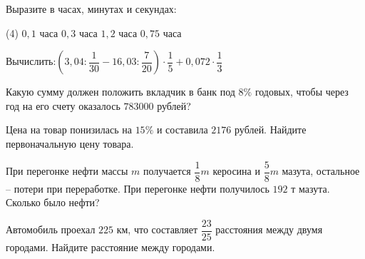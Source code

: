 %
%
\begin{exam}
	\begin{listofex}
		\item Выразите в часах, минутах и секундах:
		\begin{tasks}(4)
			\task \(0,1\) часа
			\task \(0,3\) часа
			\task \(1,2\) часа
			\task \(0,75\) часа
		\end{tasks}
		\item Вычислить:\quad\(\left(3,04:\dfrac{1}{30}-16,03: \dfrac{7}{20}\right) \cdot \dfrac{1}{5} + 0,072 \cdot \dfrac{1}{3}\)
		\item Какую сумму должен положить вкладчик в банк под \( 8\% \) годовых, чтобы через год на его счету оказалось \( 783 000 \) рублей?
		\item Цена на товар понизилась на \(15\%\) и составила \(2176\) рублей. Найдите первоначальную цену товара.
		\item При перегонке нефти массы \( m \) получается \(\dfrac{1}{8}m\)  керосина и \(\dfrac{5}{8}m \)  мазута, остальное – потери при переработке. При перегонке нефти получилось \(192\) т мазута. Сколько было нефти?
		\item Автомобиль проехал \(225\) км, что составляет \(\dfrac{23}{25}\) расстояния между двумя городами. Найдите расстояние между городами.
	\end{listofex}
\end{exam}

